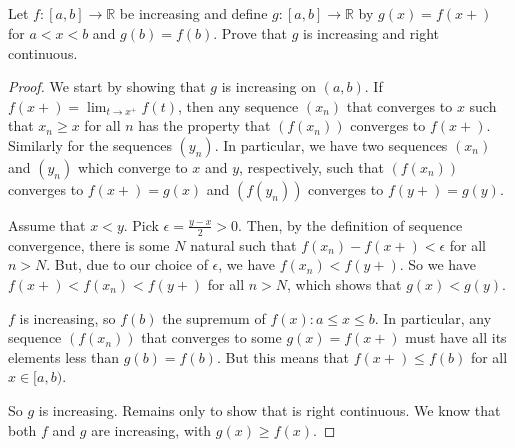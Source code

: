 \subsection{} Let $f  : [a, b ] \rightarrow \mathbb{R}$ be increasing and  define $g  :  [ a, b ] \rightarrow \mathbb{R}$ by $g(x) = f(x+)$ for $a < x < b$ and $g(b) = f(b)$. Prove that $g$ is increasing and right continuous. 

\begin{proof}

We start by showing that $g$ is increasing on $(a,b)$. If $f(x+) = \lim_{t\rightarrow x^+} f(t)$, then any sequence $(x_n)$ that converges to $x$ such that $x_n \geq x$ for all $n$ has the property that $(f(x_n))$ converges to $f(x+)$. Similarly for the sequences $(y_n)$.
In particular, we have two sequences $(x_n)$ and $(y_n)$ which converge to $x$ and $y$, respectively, such that $(f(x_n))$ converges to $f(x+) = g(x)$ and $(f(y_n))$ converges to $f(y+) = g(y)$.

Assume that $x<y$. Pick $\epsilon = \frac{y-x}{2} > 0$. Then, by the definition of sequence convergence, there is some $N$ natural such that $f(x_n) - f(x+) < \epsilon$ for all $n>N$. But, due to our choice of $\epsilon$, we have $f(x_n) < f(y+)$. So we have $f(x+) < f(x_n) < f(y+)$ for all $n>N$, which shows that $g(x) < g(y)$.

$f$ is increasing, so $f(b)$ the supremum of ${f(x) : a \leq x \leq b}$. In particular, any sequence $(f(x_n))$ that converges to some $g(x) = f(x+)$ must have all its elements less than $g(b) = f(b)$. But this means that $f(x+) \leq f(b)$ for all $x \in [a,b)$.

So $g$ is increasing. Remains only to show that is right continuous. We know that both $f$ and $g$ are increasing, with $g(x) \geq f(x)$. 

\end{proof}
